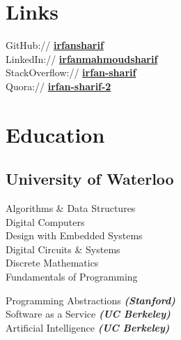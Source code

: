 ﻿\documentclass[letterpaper]{deedy-resume} %
\begin{document}
\begin{minipage}[t]{0.33\textwidth}



        \section{Links} 

        GitHub:// \href{https://github.com/irfansharif}{\bf irfansharif} \\
        LinkedIn:// \href{https://ca.linkedin.com/in/irfanmahmoudsharif
        }{\bf irfanmahmoudsharif
        } \\
        StackOverflow:// \href{http://stackoverflow.com/users/4930863/irfan-sharif}{\bf irfan-sharif}\\
        Quora:// \href{http://www.quora.com/Irfan-Sharif-2}{\bf irfan-sharif-2}


        \section{Education} 

        \subsection{University of Waterloo}


        \sectionspace %

        Algorithms \& Data Structures\\
        Digital Computers \\
        Design with Embedded Systems \\
        Digital Circuits \& Systems \\
        Discrete Mathematics \\
        Fundamentals of Programming\\
        \sectionspace %

        Programming Abstractions {\footnotesize \textit{\textbf{(Stanford)}}}\\
        Software as a Service {\footnotesize \textit{\textbf{(UC Berkeley)}}}\\
        Artificial Intelligence {\footnotesize \textit{\textbf{(UC Berkeley)}}}


\end{minipage}
\end{document}
